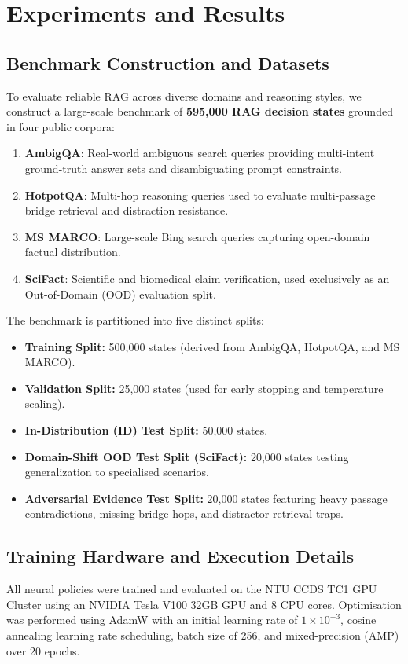 \section{Experiments and Results}
\label{sec:experiments_and_results}

\subsection{Benchmark Construction and Datasets}
To evaluate reliable RAG across diverse domains and reasoning styles, we construct a large-scale benchmark of \textbf{595,000 RAG decision states} grounded in four public corpora:
\begin{enumerate}
    \item \textbf{AmbigQA}\cite{min2020ambigqa}: Real-world ambiguous search queries providing multi-intent ground-truth answer sets and disambiguating prompt constraints.
    \item \textbf{HotpotQA}\cite{yang2018hotpotqa}: Multi-hop reasoning queries used to evaluate multi-passage bridge retrieval and distraction resistance.
    \item \textbf{MS MARCO}\cite{bajaj2016ms}: Large-scale Bing search queries capturing open-domain factual distribution.
    \item \textbf{SciFact}\cite{wadden2020fact}: Scientific and biomedical claim verification, used exclusively as an Out-of-Domain (OOD) evaluation split.
\end{enumerate}

The benchmark is partitioned into five distinct splits:
\begin{itemize}
    \item \textbf{Training Split:} 500,000 states (derived from AmbigQA, HotpotQA, and MS MARCO).
    \item \textbf{Validation Split:} 25,000 states (used for early stopping and temperature scaling).
    \item \textbf{In-Distribution (ID) Test Split:} 50,000 states.
    \item \textbf{Domain-Shift OOD Test Split (SciFact):} 20,000 states testing generalization to specialised scenarios.
    \item \textbf{Adversarial Evidence Test Split:} 20,000 states featuring heavy passage contradictions, missing bridge hops, and distractor retrieval traps.
\end{itemize}

\subsection{Training Hardware and Execution Details}
All neural policies were trained and evaluated on the NTU CCDS TC1 GPU Cluster using an NVIDIA Tesla V100 32GB GPU and 8 CPU cores. Optimisation was performed using AdamW with an initial learning rate of $1 \times 10^{-3}$, cosine annealing learning rate scheduling, batch size of 256, and mixed-precision (AMP) over 20 epochs.

